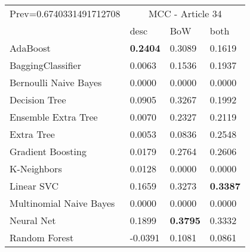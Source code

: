 \begin{tabular}{|l|l|l|l| }
\hline
Prev=0.6740331491712708 &  \multicolumn{3}{c|}{MCC - Article 34} \\
\cline{2-4} & desc & BoW & both \\ \hline
AdaBoost                & {\bf 0.2404} & 0.3089 & 0.1619\\
BaggingClassifier       & 0.0063 & 0.1536 & 0.1937\\
Bernoulli Naive Bayes   & 0.0000 & 0.0000 & 0.0000\\
Decision Tree           & 0.0905 & 0.3267 & 0.1992\\
Ensemble Extra Tree     & 0.0070 & 0.2327 & 0.2119\\
Extra Tree              & 0.0053 & 0.0836 & 0.2548\\
Gradient Boosting       & 0.0179 & 0.2764 & 0.2606\\
K-Neighbors             & 0.0128 & 0.0000 & 0.0000\\
Linear SVC              & 0.1659 & 0.3273 & {\bf 0.3387}\\
Multinomial Naive Bayes & 0.0000 & 0.0000 & 0.0000\\
Neural Net              & 0.1899 & {\bf 0.3795} & 0.3332\\
Random Forest           & -0.0391 & 0.1081 & 0.0861\\
\hline
\end{tabular}